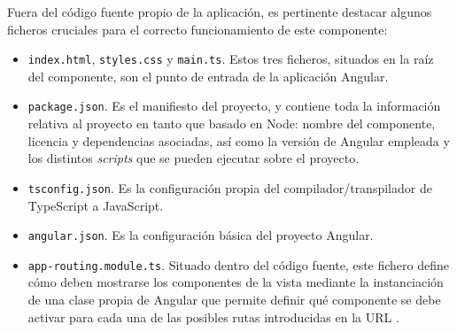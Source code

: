 Fuera del código fuente propio de la aplicación, es pertinente destacar algunos ficheros cruciales para el correcto funcionamiento de este componente:
\begin{itemize}
    \item \texttt{index.html}, \texttt{styles.css} y \texttt{main.ts}. Estos tres ficheros, situados en la raíz del componente, son el punto de entrada de la aplicación Angular.
    \item \texttt{package.json}. Es el manifiesto del proyecto, y contiene toda la información relativa al proyecto en tanto que basado en Node: nombre del componente, licencia y dependencias asociadas, así como la versión de Angular empleada y los distintos \textit{scripts} que se pueden ejecutar sobre el proyecto.
    \item \texttt{tsconfig.json}. Es la configuración propia del compilador/transpilador de TypeScript a JavaScript.
    \item \texttt{angular.json}. Es la configuración básica del proyecto Angular.
    \item \texttt{app-routing.module.ts}. Situado dentro del código fuente, este fichero define cómo deben mostrarse los componentes de la vista mediante la instanciación de una clase propia de Angular que permite definir qué componente se debe activar para cada una de las posibles rutas introducidas en la URL \cite{Arq_AngularRouter}.
\end{itemize}
